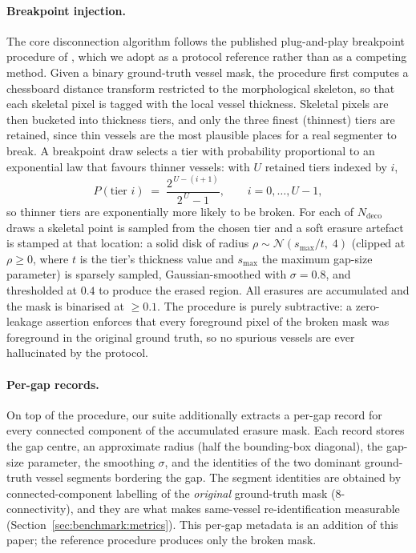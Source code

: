 \paragraph{Breakpoint injection.} The core disconnection algorithm follows
the published plug-and-play breakpoint procedure of
\cite{TODO_creatis}, which we adopt as a protocol reference rather than as a
competing method. Given a binary ground-truth vessel mask, the procedure
first computes a chessboard distance transform restricted to the morphological
skeleton, so that each skeletal pixel is tagged with the local vessel
thickness. Skeletal pixels are then bucketed into thickness tiers, and only
the three finest (thinnest) tiers are retained, since thin vessels are the
most plausible places for a real segmenter to break. A breakpoint draw
selects a tier with probability proportional to an exponential law that
favours thinner vessels: with $U$ retained tiers indexed by $i$,
\begin{equation}
  P(\text{tier } i) \;=\; \frac{2^{\,U-(i+1)}}{2^{\,U}-1},
  \qquad i = 0,\dots,U-1 ,
  \label{eq:tierprob}
\end{equation}
so thinner tiers are exponentially more likely to be broken. For each of
$N_{\mathrm{deco}}$ draws a skeletal point is sampled from the chosen tier and
a soft erasure artefact is stamped at that location: a solid disk of radius
$\rho \sim \mathcal{N}(s_{\max} / t,\; 4)$ (clipped at $\rho \geq 0$, where $t$
is the tier's thickness value and $s_{\max}$ the maximum gap-size parameter)
is sparsely sampled, Gaussian-smoothed with $\sigma = 0.8$, and thresholded at
$0.4$ to produce the erased region. All erasures are accumulated and the mask
is binarised at $\geq 0.1$. The procedure is purely subtractive: a
zero-leakage assertion enforces that every foreground pixel of the broken mask
was foreground in the original ground truth, so no spurious vessels are ever
hallucinated by the protocol.

\paragraph{Per-gap records.} On top of the \cite{TODO_creatis} procedure, our
suite additionally extracts a per-gap record for every connected component of
the accumulated erasure mask. Each record stores the gap centre, an
approximate radius (half the bounding-box diagonal), the gap-size parameter,
the smoothing $\sigma$, and the identities of the two dominant ground-truth
vessel segments bordering the gap. The segment identities are obtained by
connected-component labelling of the \emph{original} ground-truth mask
(8-connectivity), and they are what makes same-vessel re-identification
measurable (Section~\ref{sec:benchmark:metrics}). This per-gap metadata is
an addition of this paper; the reference procedure produces only the broken
mask.

